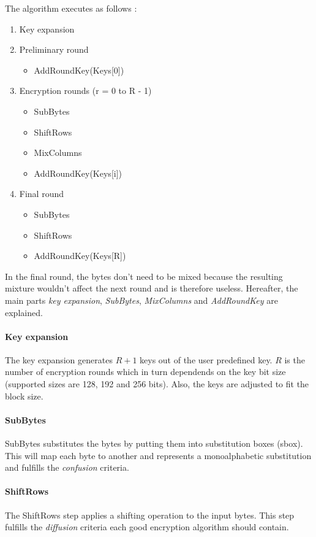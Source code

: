 The algorithm executes as follows \cite{wikipedia_aes}:
\begin{enumerate}
  \item Key expansion
  \item Preliminary round
    \begin{itemize}
      \item AddRoundKey(Keys[0])
    \end{itemize}
  \item Encryption rounds (r = 0 to R - 1)
    \begin{itemize}
      \item SubBytes
      \item ShiftRows
      \item MixColumns
      \item AddRoundKey(Keys[i]) 
    \end{itemize}
  \item Final round
    \begin{itemize}
      \item SubBytes
      \item ShiftRows
      \item AddRoundKey(Keys[R]) 
    \end{itemize}
\end{enumerate}

In the final round, the bytes don't need to be mixed because the resulting
mixture wouldn't affect the next round and is therefore useless.
Hereafter, the main parts \textit{key expansion}, \textit{SubBytes},
\textit{MixColumns} and \textit{AddRoundKey} are explained.

\paragraph{Key expansion}
The key expansion generates $R + 1$ keys out of the user predefined key.
$R$ is the number of encryption rounds which in turn dependends on the key 
bit size (supported sizes are 128, 192 and 256 bits). Also,
the keys are adjusted to fit the block size.

\paragraph{SubBytes}
SubBytes substitutes the bytes by putting them into substitution boxes (sbox).
This will map each byte to another and represents a monoalphabetic substitution
and fulfills the \textit{confusion} criteria.

\paragraph{ShiftRows}
The ShiftRows step applies a shifting operation to the input bytes. This step
fulfills the \textit{diffusion} criteria each good encryption algorithm should
contain.

